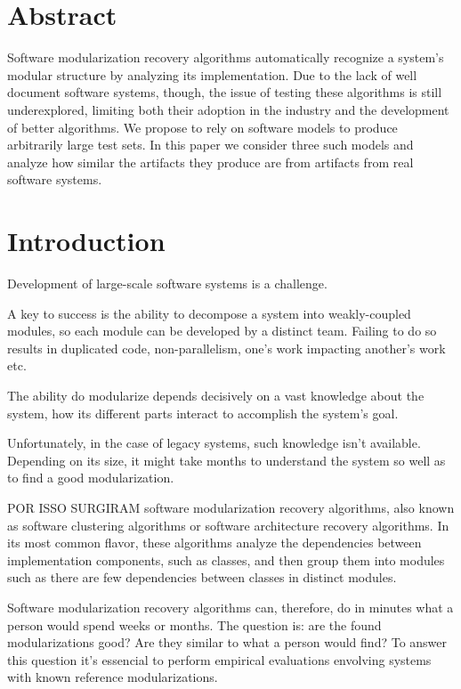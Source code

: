 \section{Abstract}

Software modularization recovery algorithms automatically recognize a system's
modular structure by analyzing its implementation.
Due to the lack of well document software systems, though, the issue of testing
these algorithms is still underexplored, limiting both their adoption in the
industry and the development of better algorithms.
We propose to rely on software models to produce arbitrarily large test sets. In
this paper we consider three such models and analyze how similar the artifacts
they produce are from artifacts from real software systems.

\section{Introduction}

Development of large-scale software systems is a challenge.

A key to success is the ability to decompose a system into weakly-coupled
modules, so each module can be developed by a distinct team. Failing to do so
results in duplicated code, non-parallelism, one's work impacting another's work
etc.

The ability do modularize depends decisively on a vast knowledge about the
system, how its different parts interact to accomplish the system's goal.

Unfortunately, in the case of legacy systems, such knowledge isn't available.
Depending on its size, it might take months to understand the system so well as
to find a good modularization.

POR ISSO SURGIRAM software modularization recovery algorithms, also known as
software clustering algorithms or software architecture recovery algorithms. In
its most common flavor, these algorithms analyze the dependencies between
implementation components, such as classes, and then group them into modules
such as there are few dependencies between classes in distinct modules.

Software modularization recovery algorithms can, therefore, do in minutes what a
person would spend weeks or months. The question is: are the found
modularizations good? Are they similar to what a person would find? To answer
this question it's essencial to perform empirical evaluations envolving systems
with known reference modularizations.

